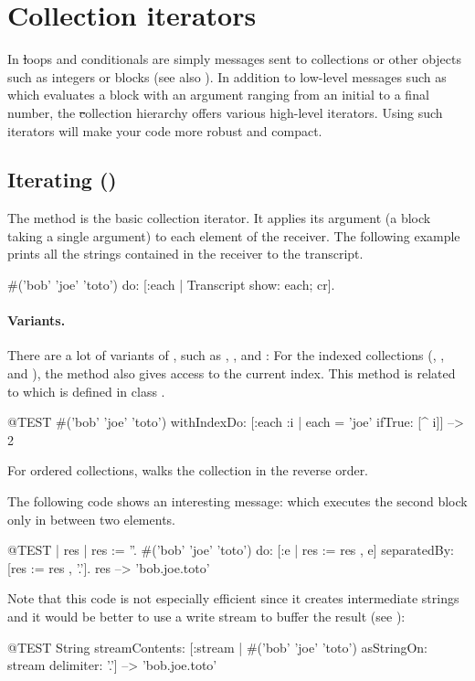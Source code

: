 \documentclass[a4paper,10pt,twoside]{book}
\begin{document}
\section{Collection iterators}
\label{sec:iterators}

In \st loops and conditionals are simply messages sent to collections or other objects such as integers or blocks (see also ).
In addition to low-level messages such as  which evaluates a block with an argument ranging from an initial to a final number, the \st collection hierarchy offers various high-level iterators.
Using such iterators will make your code more robust and compact.

\subsection{Iterating ()}
The method  is the basic collection iterator.
It applies its argument (a block taking a single argument) to each element of the receiver.
The following example prints all the strings contained in the receiver to the transcript.

\begin{code}{}
#('bob' 'joe' 'toto') do: [:each | Transcript show: each; cr].
\end{code}

\paragraph{Variants.}
There are a lot of variants of , such as \mbox{,} \mbox{}, and :
For the indexed collections (, , and ), the method  also gives access to the current index.
This method is related to  which is defined in class .

\begin{code}{@TEST}
#('bob' 'joe' 'toto') withIndexDo: [:each :i | each = 'joe' ifTrue: [^ i]] --> 2
\end{code}

For ordered collections,  walks the collection in the reverse order.

The following code shows an interesting message:  which
executes the second block only in between two elements.
\begin{code}{@TEST | res | }
res := ''.
#('bob' 'joe' 'toto') do: [:e | res := res , e] separatedBy: [res := res , '.'].
res --> 'bob.joe.toto'
\end{code}
\noindent
Note that this code is not especially efficient since it creates intermediate strings and it would be better to use a write stream to buffer the result (see ):
\begin{code}{@TEST}
String streamContents: [:stream | #('bob' 'joe' 'toto') asStringOn: stream delimiter: '.'] --> 'bob.joe.toto'
\end{code}
\end{document}
